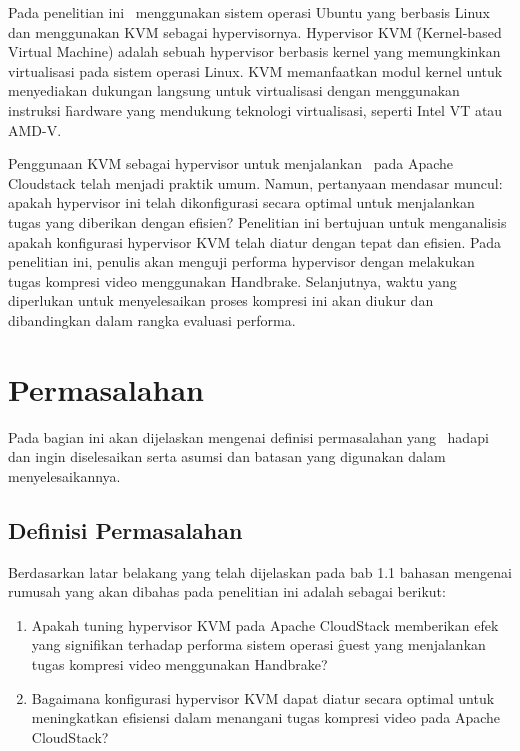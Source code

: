 Pada penelitian ini \saya\ menggunakan sistem operasi Ubuntu yang berbasis Linux dan menggunakan KVM sebagai hypervisornya. Hypervisor KVM \f{(Kernel-based Virtual Machine)} adalah sebuah hypervisor berbasis kernel yang memungkinkan virtualisasi pada sistem operasi Linux\cite{whatiskvm}. KVM memanfaatkan modul kernel untuk menyediakan dukungan langsung untuk virtualisasi dengan menggunakan instruksi \f{hardware} yang mendukung teknologi virtualisasi, seperti Intel VT atau AMD-V.

Penggunaan KVM sebagai hypervisor untuk menjalankan \vm\ pada Apache Cloudstack telah menjadi praktik umum. Namun, pertanyaan mendasar muncul: apakah hypervisor ini telah dikonfigurasi secara optimal untuk menjalankan tugas yang diberikan dengan efisien? Penelitian ini bertujuan untuk menganalisis apakah konfigurasi hypervisor KVM telah diatur dengan tepat dan efisien. Pada penelitian ini, penulis akan menguji performa hypervisor dengan melakukan tugas kompresi video menggunakan Handbrake. Selanjutnya, waktu yang diperlukan untuk menyelesaikan proses kompresi ini akan diukur dan dibandingkan dalam rangka evaluasi performa.


\section{Permasalahan}
Pada bagian ini akan dijelaskan mengenai definisi permasalahan yang \saya~hadapi dan ingin diselesaikan serta asumsi dan batasan yang digunakan dalam menyelesaikannya.


\subsection{Definisi Permasalahan}
Berdasarkan latar belakang yang telah dijelaskan pada bab 1.1 bahasan mengenai rumusah yang akan dibahas pada penelitian ini adalah sebagai berikut:
\begin{enumerate}
  \item Apakah tuning hypervisor KVM pada Apache CloudStack memberikan efek yang signifikan terhadap performa sistem operasi \f{guest} yang menjalankan tugas kompresi video menggunakan Handbrake?
  \item Bagaimana konfigurasi hypervisor KVM dapat diatur secara optimal untuk meningkatkan efisiensi dalam menangani tugas kompresi video pada Apache CloudStack?
\end{enumerate}

